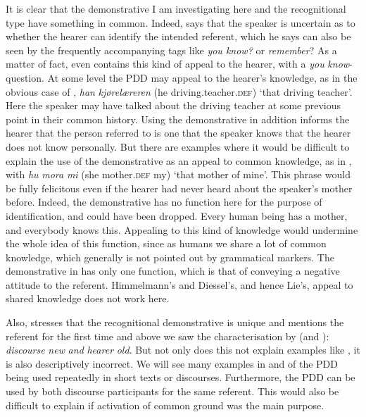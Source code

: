 \documentclass[output=paper,colorlinks,citecolor=brown]{langscibook}
\begin{document}
It is clear that the demonstrative I am investigating here and the recognitional type have something in common. Indeed, \citet[230]{Himmelmann1996} says that the speaker is uncertain as to whether the hearer can identify the intended referent, which he says can also be seen by the frequently accompanying tags like \textit{you know?} or \textit{remember}? As a matter of fact,  even contains this kind of appeal to the hearer, with a \textit{you} \textit{know}{}-question. At some level the PDD may appeal to the hearer’s knowledge, as in the obvious case of , \textit{han} \textit{kjørelæreren} (he driving.teacher.\textsc{def}) ‘that driving teacher’. Here the speaker may have talked about the driving teacher at some previous point in their common history. Using the demonstrative in addition informs the hearer that the person referred to is one that the speaker knows that the hearer does not know personally. But there are examples where it would be difficult to explain the use of the demonstrative as an appeal to common knowledge, as in , with \textit{hu} \textit{mora} \textit{mi} (she mother.\textsc{def} my) ‘that mother of mine’. This phrase would be fully felicitous even if the hearer had never heard about the speaker’s mother before. Indeed, the demonstrative has no function here for the purpose of identification, and could have been dropped. Every human being has a mother, and everybody knows this. Appealing to this kind of knowledge would undermine the whole idea of this function, since as humans we share a lot of common knowledge, which generally is not pointed out by grammatical markers. The demonstrative in  has only one function, which is that of conveying a negative attitude to the referent. Himmelmann’s and Diessel’s, and hence Lie’s, appeal to shared knowledge does not work here. 

Also, \citet[210, 236]{Himmelmann1996} stresses that the recognitional demonstrative is unique and mentions the referent for the first time and above we saw the characterisation by \citet{Diessel1999Book} (and \citealt{Lie2010}): \textit{discourse} \textit{new} \textit{and} \textit{hearer} \textit{old}. But not only does this not explain examples like , it is also descriptively incorrect. We will see many examples in  and  of the PDD being used repeatedly in short texts or discourses. Furthermore, the PDD can be used by both discourse participants for the same referent. This would also be difficult to explain if activation of common ground was the main purpose.
\end{document}
